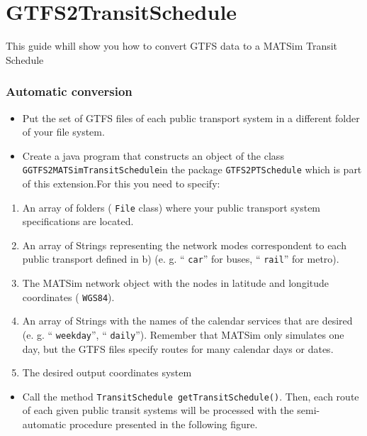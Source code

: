 \section{GTFS2TransitSchedule}

This guide whill show you how to convert GTFS data to a MATSim Transit Schedule

\subsubsection{Automatic conversion}
\begin{itemize}
	\item Put the set of GTFS files of each public transport system in a different folder of your file system.
	\item Create a java program that constructs an object of the class
\texttt{GGTFS2MATSimTransitSchedule}in the package 
\texttt{GTFS2PTSchedule} which is part of this extension.For this you need to specify:
\end{itemize}
\begin{enumerate}
	\item An array of folders (
\texttt{File} class) where your public transport system specifications are located.
	\item An array of Strings representing the network modes correspondent to each public transport defined in b) (e. g. “
\texttt{car}” for buses, “
\texttt{rail}” for metro).
	\item The MATSim network object with the nodes in latitude and longitude coordinates (
\texttt{WGS84}).
	\item An array of Strings with the names of the calendar services that are desired (e. g. “
\texttt{weekday}”, “
\texttt{daily}”). Remember that MATSim only simulates one day, but the GTFS files specify routes for many calendar days or dates.
	\item The desired output coordinates system
\end{enumerate}
\begin{itemize}
	\item Call the method 
\texttt{TransitSchedule getTransitSchedule()}.  Then, each route of each given public transit systems will be processed  with the semi-automatic procedure presented in the following figure.
\\
\end{itemize}



